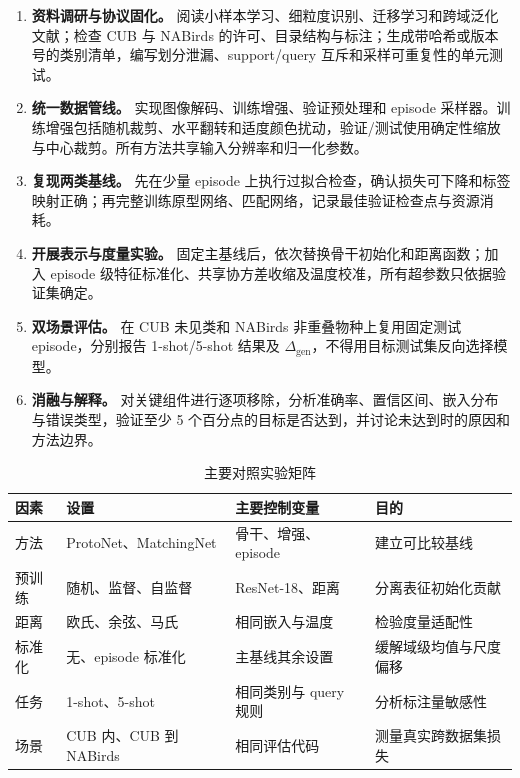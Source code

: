 \documentclass[UTF8,zihao=-4,scheme=chinese]{ctexart}
\begin{document}
\begin{enumerate}[label=\textbf{阶段\arabic*：}]
  \item \textbf{资料调研与协议固化。} 阅读小样本学习、细粒度识别、迁移学习和跨域泛化文献；检查 CUB 与 NABirds 的许可、目录结构与标注；生成带哈希或版本号的类别清单，编写划分泄漏、support/query 互斥和采样可重复性的单元测试。
  \item \textbf{统一数据管线。} 实现图像解码、训练增强、验证预处理和 episode 采样器。训练增强包括随机裁剪、水平翻转和适度颜色扰动，验证/测试使用确定性缩放与中心裁剪。所有方法共享输入分辨率和归一化参数。
  \item \textbf{复现两类基线。} 先在少量 episode 上执行过拟合检查，确认损失可下降和标签映射正确；再完整训练原型网络、匹配网络，记录最佳验证检查点与资源消耗。
  \item \textbf{开展表示与度量实验。} 固定主基线后，依次替换骨干初始化和距离函数；加入 episode 级特征标准化、共享协方差收缩及温度校准，所有超参数只依据验证集确定。
  \item \textbf{双场景评估。} 在 CUB 未见类和 NABirds 非重叠物种上复用固定测试 episode，分别报告 1-shot/5-shot 结果及 $\Delta_{\mathrm{gen}}$，不得用目标测试集反向选择模型。
  \item \textbf{消融与解释。} 对关键组件进行逐项移除，分析准确率、置信区间、嵌入分布与错误类型，验证至少 5 个百分点的目标是否达到，并讨论未达到时的原因和方法边界。
\end{enumerate}

\begin{table}[htbp]
  \centering
  \caption{主要对照实验矩阵}
  \label{tab:matrix}
  \small
  \begin{tabularx}{\textwidth}{p{2.3cm}p{2.7cm}p{3.2cm}X}
    \toprule
    因素 & 设置 & 主要控制变量 & 目的 \\
    \midrule
    方法 & ProtoNet、MatchingNet & 骨干、增强、episode & 建立可比较基线 \\
    预训练 & 随机、监督、自监督 & ResNet-18、距离 & 分离表征初始化贡献 \\
    距离 & 欧氏、余弦、马氏 & 相同嵌入与温度 & 检验度量适配性 \\
    标准化 & 无、episode 标准化 & 主基线其余设置 & 缓解域级均值与尺度偏移 \\
    任务 & 1-shot、5-shot & 相同类别与 query 规则 & 分析标注量敏感性 \\
    场景 & CUB 内、CUB 到 NABirds & 相同评估代码 & 测量真实跨数据集损失 \\
    \bottomrule
  \end{tabularx}
\end{table}
\end{document}
